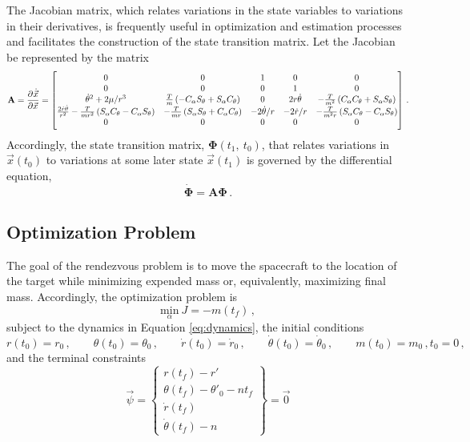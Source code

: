 \documentclass[conf]{new-aiaa}
\begin{document}
The Jacobian matrix, which relates variations in the state variables to variations in their derivatives, is frequently useful in optimization and estimation processes and facilitates the construction of the state transition matrix. Let the Jacobian be represented by the matrix
\begin{equation}
	\mathbf{A} = \dpd{\dot{\vec{x}}}{\vec{x}} = \begin{bmatrix}
		0 & 0 & 1 & 0 & 0\\
		0 & 0 & 0 & 1 & 0\\
		\dot{\theta}^2 + 2\mu/r^3 & \frac{T}{m}\left( -C_{\alpha}S_{\theta} + S_{\alpha}C_{\theta} \right) & 0 & 2r\dot{\theta} & -\frac{T}{m^2}\left( C_{\alpha}C_{\theta} + S_{\alpha}S_{\theta} \right)\\
		\frac{2\dot{r}\dot{\theta}}{r^2} - \frac{T}{mr^2}\left( S_{\alpha}C_{\theta} - C_{\alpha}S_{\theta} \right) & -\frac{T}{mr} \left( S_{\alpha}S_{\theta} + C_{\alpha}C_{\theta} \right) & -2\dot{\theta}/r & -2\dot{r}/r & -\frac{T}{m^2r} \left( S_{\alpha}C_{\theta} - C_{\alpha} S_{\theta} \right)\\
		0 & 0 & 0 & 0 & 0
	\end{bmatrix}\,.
\end{equation}
Accordingly, the state transition matrix, $\mathbf{\Phi}(t_1,~t_0)$, that relates variations in $\vec{x}(t_0)$ to variations at some later state $\vec{x}(t_1)$ is governed by the differential equation,
\begin{equation}
	\dot{\mathbf{\Phi}} = \mathbf{A \Phi}\,.
\end{equation}

\subsection{Optimization Problem}
The goal of the rendezvous problem is to move the spacecraft to the location of the target while minimizing expended mass or, equivalently, maximizing final mass. Accordingly, the optimization problem is
\begin{equation}
	\underset{\alpha}{\text{min}} ~J = -m(t_f)\,,
\end{equation}
subject to the dynamics in Equation \eqref{eq:dynamics}, the initial conditions
\[
	r(t_0) = r_0\,, \qquad \theta(t_0) = \theta_0\,, \qquad \dot{r}(t_0) = \dot{r}_0\,, \qquad \dot{\theta}(t_0) = \dot{\theta}_0\,, \qquad m(t_0) = m_0\,, t_0 = 0\,,
\]
and the terminal constraints
\begin{equation}
	\vec{\psi} = \begin{Bmatrix}
		r(t_f) - r'\\
		\theta(t_f) - \theta'_0 - n t_f\\
		\dot{r}(t_f)\\
		\dot{\theta}(t_f) - n
	\end{Bmatrix} = \vec{0}
\end{equation}
\end{document}
